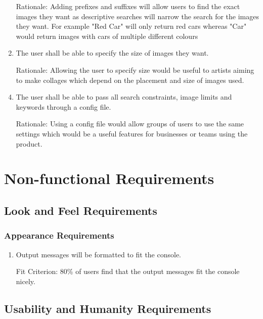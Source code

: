\documentclass[12pt, titlepage]{article}
\begin{document}
\begin{enumerate}[label=FR\arabic*:, wide=0pt, leftmargin=*]
    \item[Rationale:] Adding prefixes and suffixes will allow users to find the exact images they want as descriptive searches will narrow the search for the images they want. For example "Red Car" will only return red cars whereas "Car" would return images with cars of multiple different colours
    \\
    \item The user shall be able to specify the size of images they want.
    \item[Rationale:] Allowing the user to specify size would be useful to artists aiming to make collages which depend on the placement and size of images used.
    \\
    \item The user shall be able to pass all search constraints, image limits and keywords through a config file.
    \item[Rationale:] Using a config file would allow groups of users to use the same settings which would be a useful features for businesses or teams using the product.

\end{enumerate}

\section{Non-functional Requirements}

\subsection{Look and Feel Requirements}

\subsubsection{Appearance Requirements}

\begin{enumerate}[label=AR\arabic*:, wide=0pt, leftmargin=*]
    \item Output messages will be formatted to fit the console.
    \item [Fit Criterion:] 80\% of users find that the output messages fit the console nicely. 
\end{enumerate}

\subsection{Usability and Humanity Requirements}
\end{document}
